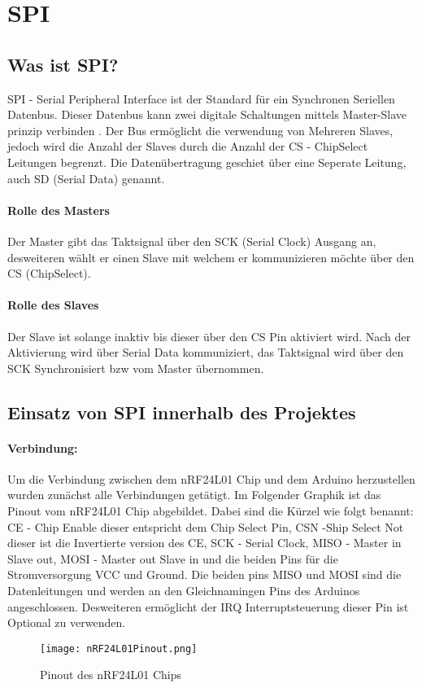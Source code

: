 \documentclass{article}
\begin{document}
\newpage    
\section{SPI}%
\subsection{Was ist SPI?} %
SPI - Serial Peripheral Interface ist der Standard für ein Synchronen Seriellen Datenbus. Dieser Datenbus kann zwei digitale Schaltungen mittels Master-Slave prinzip verbinden \cite{SPI}. Der Bus ermöglicht die verwendung von Mehreren Slaves, jedoch wird die Anzahl der Slaves durch die Anzahl der CS - ChipSelect Leitungen begrenzt. Die Datenübertragung geschiet über eine Seperate Leitung, auch SD (Serial Data) genannt. 
\paragraph{Rolle des Masters}
Der Master gibt das Taktsignal über den SCK (Serial Clock) Ausgang an, desweiteren wählt er einen Slave mit welchem er kommunizieren möchte über den CS (ChipSelect).
\paragraph{Rolle des Slaves}
Der Slave ist solange inaktiv bis dieser über den CS Pin aktiviert wird. Nach der Aktivierung wird über Serial Data kommuniziert, das Taktsignal wird über den SCK Synchronisiert bzw vom Master übernommen. 

\subsection{Einsatz von SPI innerhalb des Projektes}
\paragraph{Verbindung: }
Um die Verbindung zwischen dem nRF24L01 Chip und dem Arduino herzustellen  wurden zunächst alle Verbindungen getätigt. Im Folgender Graphik ist das Pinout vom nRF24L01 Chip abgebildet. Dabei sind die Kürzel wie folgt benannt: CE - Chip Enable dieser entspricht dem Chip Select Pin, CSN -Ship Select Not dieser ist die Invertierte version des CE, SCK - Serial Clock, MISO - Master in Slave out, MOSI - Master out Slave in und die beiden Pins für die Stromversorgung VCC und Ground. Die beiden pins MISO und MOSI sind die Datenleitungen und werden an den Gleichnamingen Pins des Arduinos angeschlossen. Desweiteren ermöglicht der IRQ Interruptsteuerung dieser Pin ist Optional zu verwenden.
\begin{figure}[h]
	\texttt{[image: nRF24L01Pinout.png]}
	\centering
	\caption{Pinout des nRF24L01 Chips \cite{nRF24Pinout}}
\end{figure}
\end{document}
